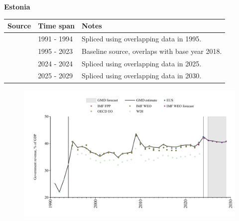 \documentclass[12pt,a4paper,landscape]{article}
\begin{document}
\begin{adjustbox}{max totalsize={\paperwidth}{\paperheight},center}
\begin{minipage}[t][\textheight][t]{\textwidth}
\vspace*{0.5cm}
{}
\begin{center}
{\Large\bfseries Estonia}
\end{center}
\vspace{0.5cm}
\begin{table}[H]
\centering
\small
\begin{tabular}{|l|l|l|}
\hline
\textbf{Source} & \textbf{Time span} & \textbf{Notes} \\
\hline
\rowcolor{white}\cite{WDI}& 1991 - 1994 &Spliced using overlapping data in 1995.\\
\rowcolor{lightgray}\cite{OECD_EO}& 1995 - 2023 &Baseline source, overlaps with base year 2018.\\
\rowcolor{white}\cite{EUS}& 2024 - 2024 &Spliced using overlapping data in 2025.\\
\rowcolor{lightgray}\cite{IMF_WEO_forecast}& 2025 - 2029 &Spliced using overlapping data in 2030.\\
\hline
\end{tabular}
\end{table}
\begin{figure}[H]
\centering
\includegraphics[width=\textwidth,height=0.6\textheight,keepaspectratio]{graphs/EST_govrev_GDP.pdf}
\end{figure}
\end{minipage}
\end{adjustbox}
\end{document}
